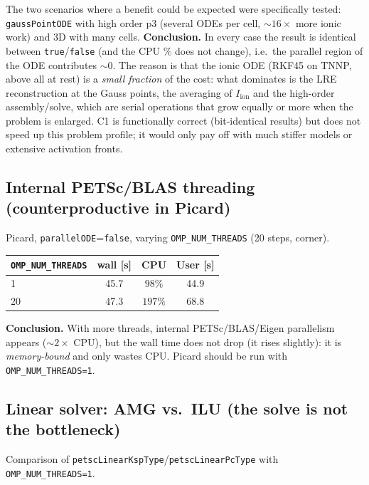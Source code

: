 \documentclass[11pt,a4paper]{article}
\newcommand{\code}[1]{\texttt{\small #1}}
\newcommand{\Iion}{I_{\mathrm{ion}}}
\newcommand{\dictkey}[1]{\textcolor{black!60!green}{\texttt{\footnotesize #1}}}
\begin{document}
\noindent The two scenarios where a benefit could be expected were specifically
tested: \dictkey{gaussPointODE} with high order p3 (several ODEs per cell,
$\sim\!16\times$ more ionic work) and 3D with many cells.
\textbf{Conclusion.} In every case the result is identical between
\code{true}/\code{false} (and the CPU $\%$ does not change), i.e.\ the parallel region
of the ODE contributes $\sim 0$. The reason is that the ionic ODE (RKF45 on TNNP, above
all at rest) is a \emph{small fraction} of the cost: what dominates is the LRE
reconstruction at the Gauss points, the averaging of $\Iion$ and the high-order
assembly/solve, which are serial operations that grow equally or more when the problem
is enlarged. C1 is functionally correct (bit-identical results) but does not speed up this
problem profile; it would only pay off with much stiffer models or extensive activation
fronts.

\subsection{Internal PETSc/BLAS threading (counterproductive in Picard)}
\label{sec:exp-threads}

Picard, \dictkey{parallelODE}=\code{false}, varying \code{OMP\_NUM\_THREADS}
(20 steps, corner).

\begin{center}
\begin{tabular}{@{}lccc@{}}
\toprule
\code{OMP\_NUM\_THREADS} & wall [s] & CPU & User [s] \\
\midrule
1  & 45.7 & $98\%$  & 44.9 \\
20 & 47.3 & $197\%$ & 68.8 \\
\bottomrule
\end{tabular}
\end{center}

\noindent\textbf{Conclusion.} With more threads, internal PETSc/BLAS/Eigen
parallelism appears ($\sim 2\times$ CPU), but the wall time does not drop (it rises
slightly): it is \emph{memory-bound} and only wastes CPU. Picard should be run
with \code{OMP\_NUM\_THREADS=1}.

\subsection{Linear solver: AMG vs.\ ILU (the solve is not the bottleneck)}
\label{sec:exp-gamg}

Comparison of \dictkey{petscLinearKspType}/\dictkey{petscLinearPcType} with
\code{OMP\_NUM\_THREADS=1}.
\end{document}
